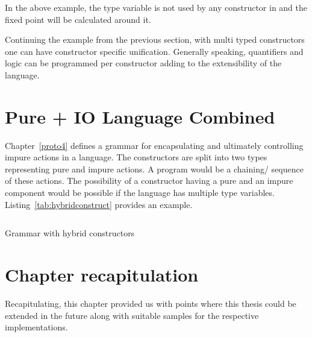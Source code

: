 \documentclass[thesis-solanki.tex]{subfiles}
\begin{document}
In the above example, the  type variable is not used by any constructor in
 and the fixed point will be calculated around it.

Continuing the example from the previous section, with multi typed constructors one can have constructor specific
unification.
Generally speaking, quantifiers and logic can be programmed per constructor adding to the extensibility of the
language.

\section{Pure + IO Language Combined}
Chapter~\ref{proto4} defines a grammar for encapsulating and ultimately controlling impure actions in a language.
The constructors are split into two types representing pure and impure actions.
A program would be a chaining/ sequence of these actions.
The possibility of a constructor having a pure and an impure component would be possible if the language has
multiple type variables.
Listing~\ref{tab:hybridconstruct} provides an example.


\begin{code-list}[H]
\begin{singlespace}
\inputminted{haskell}{haskell-proto4-hybrid-construct.hs}
\end{singlespace}
\caption{Grammar with hybrid constructors}
\label{tab:hybridconstruct}
\end{code-list}

\section{Chapter recapitulation}
Recapitulating, this chapter provided us with points where this thesis could be extended in the future along with
suitable samples for the respective implementations.


\ifMain\ifDraft
\begin{scope}
  \nolinenumbers
  \enotesize
  \par
  \begin{singlespace}
  \setlength{\parskip}{12pt plus 2pt minus 1pt}
  \theendnotes
  \par
  \end{singlespace}
\end{scope}
\fi\fi
\end{document}
